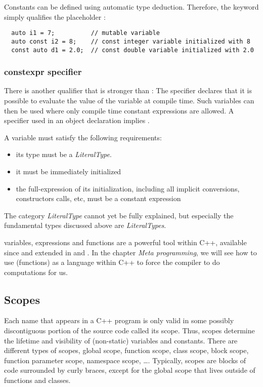 Constants can be defined using automatic type deduction. Therefore, the keyword  simply qualifies the placeholder :
%
\begin{verbatim}
  auto i1 = 7;          // mutable variable
  auto const i2 = 8;    // const integer variable initialized with 8
  const auto d1 = 2.0;  // const double variable initialized with 2.0
\end{verbatim}

\subsubsection{constexpr specifier}
There is another qualifier that is stronger than : The  specifier declares that it is possible to evaluate the
value of the variable at compile time. Such variables can then be used where only compile time constant expressions are allowed.
A  specifier used in an object declaration implies .

A  variable must satisfy the following requirements:
\begin{itemize}
  \item its type must be a \emph{LiteralType}.
  \item it must be immediately initialized
  \item the full-expression of its initialization, including all implicit conversions, constructors calls, etc, must be a constant expression
\end{itemize}

The category \emph{LiteralType} cannot yet be fully explained, but especially the fundamental types discussed above are \emph{LiteralTypes}.

\begin{rem}
   variables, expressions and functions are a powerful tool within C++, available since  and extended in  and .
  In the chapter \emph{Meta programming}, we will see how to use  (functions) as a language within C++ to force the compiler to
  do computations for us.
\end{rem}


\subsection{Scopes}
Each name that appears in a C++ program is only valid in some possibly discontiguous portion of the source code called its scope. Thus,
scopes determine the lifetime and visibility of (non-static) variables and constants. There are different types of scopes,
global scope, function scope, class scope, block scope, function parameter scope, namespace scope, \dots. Typically, scopes are blocks of
code surrounded by curly braces, except for the global scope that lives outside of functions and classes.

